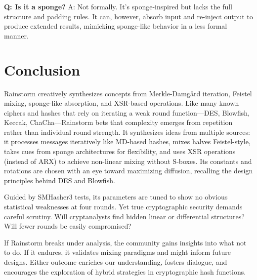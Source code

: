 \documentclass[11pt,a4paper]{article}
\begin{document}
\textbf{Q: Is it a sponge?}  
A: Not formally. It’s sponge-inspired but lacks the full structure and padding rules. It can, however, absorb input and re-inject output to produce extended results, mimicking sponge-like behavior in a less formal manner.

\section*{Conclusion}
Rainstorm creatively synthesizes concepts from Merkle-Damg{\aa}rd iteration, Feistel mixing, sponge-like absorption, and XSR-based operations. Like many known ciphers and hashes that rely on iterating a weak round function—DES, Blowfish, Keccak, ChaCha—Rainstorm bets that complexity emerges from repetition rather than individual round strength. It synthesizes ideas from multiple sources: it processes messages iteratively like MD-based hashes, mixes halves Feistel-style, takes cues from sponge architectures for flexibility, and uses XSR operations (instead of ARX) to achieve non-linear mixing without S-boxes. Its constants and rotations are chosen with an eye toward maximizing diffusion, recalling the design principles behind DES and Blowfish.

Guided by SMHasher3 tests, its parameters are tuned to show no obvious statistical weaknesses at four rounds. Yet true cryptographic security demands careful scrutiny. Will cryptanalysts find hidden linear or differential structures? Will fewer rounds be easily compromised?

If Rainstorm breaks under analysis, the community gains insights into what not to do. If it endures, it validates mixing paradigms and might inform future designs. Either outcome enriches our understanding, fosters dialogue, and encourages the exploration of hybrid strategies in cryptographic hash functions.
\end{document}
